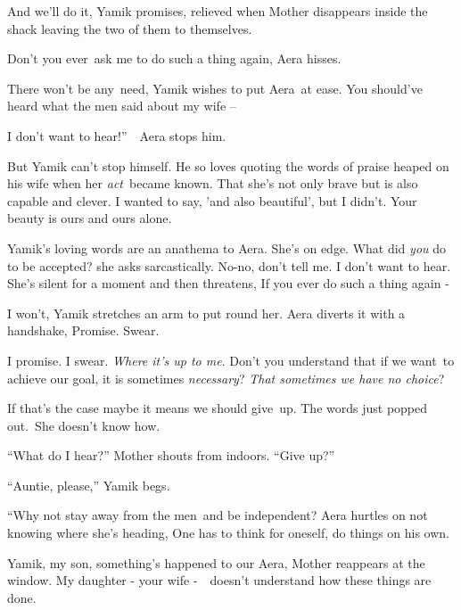 \documentclass[twoside,11pt]{book}
\begin{document}
{\textquotedbl}And we'll do it,{\textquotedbl} Yamik promises, relieved when Mother disappears inside the shack leaving
the two of them to themselves. 

{\textquotedbl}Don't you ever~ask me to do such a thing again,{\textquotedbl} Aera hisses. 

{\textquotedbl}There won't be any~need,{\textquotedbl} Yamik wishes to put Aera\ at ease. {\textquotedbl}You should've
heard what the men said about my wife --{\textquotedbl} 

{\textquotedbl}I don't want to hear!''\ \ Aera stops him.\ 

But Yamik can't stop himself. He so loves quoting the words of praise heaped on his wife when her \textit{act}\ became
known. {\textquotedbl}That she's not only brave but is also capable and clever. I wanted to say, 'and also beautiful',
but I didn't. Your beauty is ours and ours alone.{\textquotedbl} ~

Yamik's loving words are an anathema to Aera. She's on edge. {\textquotedbl}What did \textit{you} do to be
accepted?{\textquotedbl} she asks sarcastically. {\textquotedbl}No-no, don't tell me. I don't want to
hear.{\textquotedbl} She's silent for a moment and then threatens, {\textquotedbl}If you ever do such a thing again
-{\textquotedbl}

{\textquotedbl}I won't,{\textquotedbl} Yamik stretches an arm to put round her. Aera diverts it with a handshake,
{\textquotedbl}Promise. Swear.{\textquotedbl} 

{\textquotedbl}I promise. I swear. \textit{Where it's up to me}. Don't you understand that if we want~to achieve our
goal, it is sometimes \textit{necessary}? \textit{That sometimes we have no choice}?{\textquotedbl} 

{\textquotedbl}If that's the case maybe it means we should give~up.{\textquotedbl} The words just popped out.\ She
doesn't know how.

{}``What do I hear?'' Mother shouts from indoors. ``Give up?'' 

{}``Auntie, please,'' Yamik begs.

{}``Why not stay away from the men~and be independent?{\textquotedbl} Aera hurtles on not knowing where she's heading,
{\textquotedbl}One has to think for oneself, do things on his own.{\textquotedbl}

{\textquotedbl}Yamik, my son, something's happened to our Aera,{\textquotedbl} Mother reappears at the window.
{\textquotedbl}My daughter - your wife -\ \ doesn't understand how these things are done.{\textquotedbl} 
\end{document}
